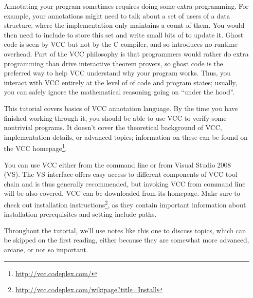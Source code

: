 Annotating your program sometimes requires doing some extra
programming.  For example, your annotations might need to talk about a
set of users of a data structure, where the implementation only
maintains a count of them.  You would then need to include  to store this set and write small bits of  to
update it.  Ghost code is seen by VCC but not by the C compiler, and
so introduces no runtime overhead. Part of the VCC philosophy is that
programmers would rather do extra programming than drive interactive
theorem provers, so ghost code is the preferred way to help VCC
understand why your program works.  Thus, you interact with VCC
entirely at the level of of code and program states; usually, you can
safely ignore the mathematical reasoning going on ``under the hood''.

This tutorial covers basics of VCC annotation language. By the time
you have finished working through it, you should be able to use VCC to
verify some nontrivial programs. It doesn't cover the theoretical
background of VCC, implementation details, or advanced topics;
information on these can be found on the VCC
homepage\footnote{\url{http://vcc.codeplex.com/}}.


You can use VCC either from the command line or from Visual Studio
2008 (VS).
The VS interface offers easy access to different components of
VCC tool chain and is thus generally recommended,
but invoking VCC from command line will be also covered.
VCC can be downloaded from its homepage.
Make sure to check out installation instructions\footnote{\url{http://vcc.codeplex.com/wikipage?title=Install}},
as they contain important information about installation prerequisites 
and setting include paths.


\begin{note}
  Throughout the tutorial, we'll use notes like this one to discuss
  topics, which can be skipped on the first reading, either because
  they are somewhat more advanced, arcane, or not so important.
\end{note}

